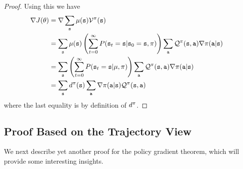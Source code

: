\begin{proof}
Using this we have
\begin{align*}
\nabla J(\theta) &= \nabla \sum_{{\tt s}} \mu({\tt s}) \mathcal{V}^\pi ({\tt s})\\
&= \sum_{\tt s} \mu({\tt s}) \left(\sum_{t=0}^\infty P({\tt s}_t = {\tt s} | {\tt s}_0 = {\tt s}, \pi) \right) \sum_{\tt a} \mathcal{Q}^\pi ({\tt s},{\tt a}) \nabla\pi({\tt a}|{\tt s}) \\
&= \sum_{\tt s} \left(\sum_{t=0}^\infty P({\tt s}_t = {\tt s} | \mu, \pi) \right) \sum_{\tt a} \mathcal{Q}^\pi ({\tt s},{\tt a}) \nabla\pi({\tt a}|{\tt s}) \\
&= \sum_{\tt s} d^{\pi}({\tt s}) \sum_{\tt a} \nabla\pi({\tt a}|{\tt s}) \mathcal{Q}^\pi ({\tt s},{\tt a}) \\
\end{align*}
where the last equality is by definition of $d^{\pi}$.
\end{proof}


\subsection{Proof Based on the Trajectory View}

We next describe yet another proof for the policy gradient theorem, which will provide some interesting insights.

